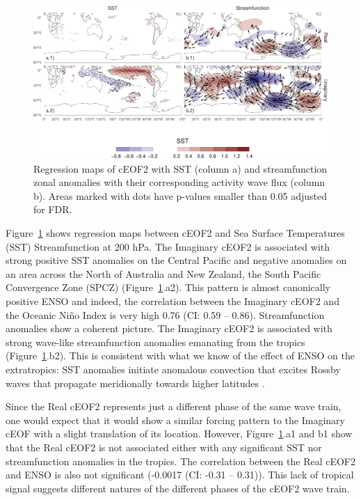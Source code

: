 \documentclass[smallextended]{svjour3}       %
\begin{document}
\begin{figure}
\includegraphics{../figures/sst-psi-2-1} \caption{Regression maps of cEOF2 with SST (column a) and streamfunction zonal anomalies with their corresponding activity wave flux (column b). Areas marked with dots have p-values smaller than 0.05 adjusted for FDR.}\label{fig:sst-psi-2}
\end{figure}

Figure~\ref{fig:sst-psi-2} shows regression maps between cEOF2 and Sea Surface Temperatures (SST) Streamfunction at 200 hPa. The Imaginary cEOF2 is associated with strong positive SST anomalies on the Central Pacific and negative anomalies on an area across the North of Australia and New Zealand, the South Pacific Convergence Zone (SPCZ) (Figure~\ref{fig:sst-psi-2}.a2). This pattern is almost canonically positive ENSO and indeed, the correlation between the Imaginary cEOF2 and the Oceanic Niño Index \citep{bamston1997} is very high 0.76 (CI: 0.59 -- 0.86). Streamfunction anomalies show a coherent picture. The Imaginary cEOF2 is associated with strong wave-like streamfunction anomalies emanating from the tropics (Figure~\ref{fig:sst-psi-2}.b2). This is consistent with what we know of the effect of ENSO on the extratropics: SST anomalies initiate anomalous convection that excites Rossby waves that propagate meridionally towards higher latitudes \citep{mo2000}.

Since the Real cEOF2 represents just a different phase of the same wave train, one would expect that it would show a similar forcing pattern to the Imaginary cEOF with a slight translation of its location. However, Figure~\ref{fig:sst-psi-2}.a1 and b1 show that the Real cEOF2 is not associated either with any significant SST nor streamfunction anomalies in the tropics. The correlation between the Real cEOF2 and ENSO is also not significant (-0.0017 (CI: -0.31 -- 0.31)). This lack of tropical signal suggests different natures of the different phases of the cEOF2 wave train.
\end{document}
